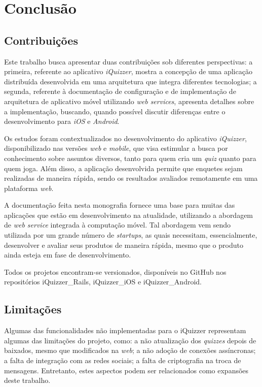 \chapter{Conclusão} \label{CHP:CONC}


\section{Contribuições}
	Este trabalho busca apresentar duas contribuições sob diferentes perspectivas: a primeira, referente ao aplicativo \emph{iQuizzer}, mostra a concepção de uma aplicação distribuída desenvolvida em uma arquitetura que integra diferentes tecnologias; a segunda, referente à documentação de configuração e de implementação de arquitetura de aplicativo móvel utilizando \emph{web services}, apresenta detalhes sobre a implementação, buscando, quando possível discutir diferenças entre o desenvolvimento para \emph{iOS} e \emph{Android}.
	
	Os estudos foram contextualizados no desenvolvimento do aplicativo \emph{iQuizzer}, disponibilizado nas versões \emph{web} e \emph{mobile}, que visa estimular a busca por conhecimento sobre assuntos diversos, tanto para quem cria um \emph{quiz} quanto para quem joga. Além disso, a aplicação desenvolvida permite que enquetes sejam realizadas de maneira rápida, sendo os resultados avaliados remotamente em uma plataforma \emph{web}.
	
	A documentação feita nesta monografia fornece uma base para muitas das aplicações que estão em desenvolvimento na atualidade, utilizando a abordagem de \emph{web service} integrada à computação móvel. Tal abordagem vem sendo utilizada por um grande número de \emph{startups}, as quais necessitam, essencialmente, desenvolver e avaliar seus produtos de maneira rápida, mesmo que o produto ainda esteja em fase de desenvolvimento.

	Todos os projetos encontram-se versionados, disponíveis no GitHub nos repositórios iQuizzer\_Rails\cite{codigosrails}, iQuizzer\_iOS\cite{codigosios} e iQuizzer\_Android\cite{codigosandroid}.
\section{Limitações}
	
	Algumas das funcionalidades não implementadas para o iQuizzer representam algumas das limitações do projeto, como: a não atualização dos \emph{quizzes} depois de baixados, mesmo que modificados na \emph{web}; a não adoção de conexões assíncronas; a falta de integração com as redes sociais; a falta de criptografia na troca de mensagens. Entretanto, estes aspectos podem ser relacionados como expansões deste trabalho. 
	
